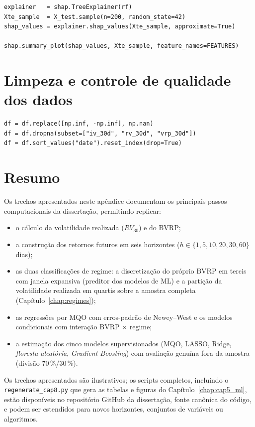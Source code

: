 \begin{verbatim}
explainer   = shap.TreeExplainer(rf)
Xte_sample  = X_test.sample(n=200, random_state=42)
shap_values = explainer.shap_values(Xte_sample, approximate=True)

shap.summary_plot(shap_values, Xte_sample, feature_names=FEATURES)
\end{verbatim}

\section{Limpeza e controle de qualidade dos dados}

\begin{verbatim}
df = df.replace([np.inf, -np.inf], np.nan)
df = df.dropna(subset=["iv_30d", "rv_30d", "vrp_30d"])
df = df.sort_values("date").reset_index(drop=True)
\end{verbatim}

\section{Resumo}

Os trechos apresentados neste apêndice documentam os principais passos
computacionais da dissertação, permitindo replicar:

\begin{itemize}
    \item o cálculo da volatilidade realizada ($RV_{30}$) e do BVRP;
    \item a construção dos retornos futuros em seis horizontes
          ($h \in \{1, 5, 10, 20, 30, 60\}$ dias);
    \item as duas classificações de regime: a discretização do próprio
          BVRP em tercis com janela expansiva (preditor dos modelos de
          ML) e a partição da volatilidade realizada em quartis sobre a
          amostra completa (Capítulo~\ref{chap:regimes});
    \item as regressões por MQO com erros-padrão de Newey--West e os modelos
          condicionais com interação BVRP $\times$ regime;
    \item a estimação dos cinco modelos supervisionados (MQO, LASSO, Ridge,
          \textit{floresta aleatória}, \textit{Gradient Boosting}) com avaliação
          genuína fora da amostra (divisão 70\,\%/30\,\%).
\end{itemize}

Os trechos apresentados são ilustrativos; os scripts completos, incluindo o
\texttt{regenerate\_cap8.py} que gera as tabelas e figuras do
Capítulo~\ref{chap:cap5_ml}, estão disponíveis no repositório GitHub da
dissertação, fonte canônica do código, e podem ser estendidos para novos
horizontes, conjuntos de variáveis ou algoritmos.